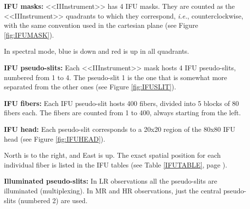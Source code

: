 \begin{description}
  \item {\bf IFU masks:} <<IIInstrument>> has 4 IFU masks. They are counted as
        the <<IIInstrument>> quadrants to which they correspond, {\it i.e.},
        counterclockwise, with the same convention used in the
        cartesian plane (see Figure \ref{fig:IFUMASK}).


        In spectral mode, blue is down and red is up in all quadrants.

  \item {\bf IFU pseudo-slits:} Each <<IIInstrument>> mask hosts 4 IFU pseudo-slits,
        numbered from 1 to 4. The pseudo-slit 1
        is the one that is somewhat more separated from the other ones
        (see Figure \ref{fig:IFUSLIT}).



  \item {\bf IFU fibers:} Each IFU pseudo-slit hosts 400 fibers, divided
        into 5 blocks of 80 fibers each. The fibers are counted from
        1 to 400, always starting from the left.

  \item {\bf IFU head:} Each pseudo-slit corresponds to a 20x20 region of the
        80x80 IFU head (see Figure \ref{fig:IFUHEAD}).


        North is to the right, and East is up. The exact spatial position
        for each individual fiber is listed in the IFU tables (see Table
        \ref{IFUTABLE}, page \pageref{IFUTABLE}).

\item {\bf Illuminated pseudo-slits:} In LR observations all the
      pseudo-slits are illuminated (multiplexing). In MR and HR
      observations, just the central pseudo-slits (numbered 2)
      are used.

\end{description}


